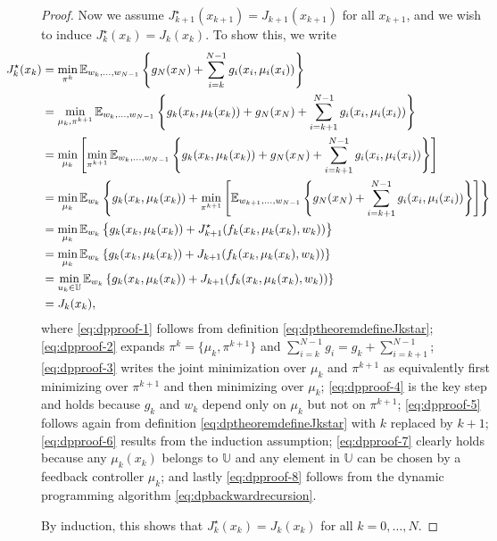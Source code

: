 \documentclass[
]{book}
\theoremstyle{definition}
\theoremstyle{definition}
\theoremstyle{definition}
\theoremstyle{definition}
\theoremstyle{remark}
\begin{document}
\begin{proof}
Now we assume \(J^\star_{k+1}(x_{k+1}) = J_{k+1}(x_{k+1})\) for all \(x_{k+1}\), and we wish to induce \(J^\star_{k}(x_{k}) = J_{k}(x_{k})\). To show this, we write
\begin{align}
\hspace{-16mm} J^\star_{k}(x_k) &= \min_{\pi^k} \mathbb{E}_{w_k,\dots,w_{N-1}} \left\{ g_N(x_N) + \sum_{i=k}^{N-1} g_i (x_i,\mu_i(x_i)) \right\} \label{eq:dpproof-1}\\
&= \min_{\mu_k,\pi^{k+1}} \mathbb{E}_{w_k,\dots,w_{N-1}} \left\{ g_k(x_k,\mu_k(x_k)) + g_N(x_N) + \sum_{i=k+1}^{N-1} g_i(x_i,\mu_i(x_i))  \right\}
\label{eq:dpproof-2}\\
&= \min_{\mu_k} \left[ \min_{\pi^{k+1}} \mathbb{E}_{w_k,\dots,w_{N-1}} \left\{ g_k(x_k,\mu_k(x_k)) + g_N(x_N) + \sum_{i=k+1}^{N-1} g_i(x_i,\mu_i(x_i))  \right\}\right] \label{eq:dpproof-3}\\
&= \min_{\mu_k} \mathbb{E}_{w_k} \left\{ g_k(x_k,\mu_k(x_k)) + \min_{\pi^{k+1}} \left[ \mathbb{E}_{w_{k+1},\dots,w_{N-1}} \left\{ g_N(x_N) + \sum_{i=k+1}^{N-1} g_i(x_i,\mu_i(x_i))  \right\}  \right]    \right\} \label{eq:dpproof-4}\\
&= \min_{\mu_k} \mathbb{E}_{w_k} \left\{ g_k(x_k,\mu_k(x_k)) + J^\star_{k+1}(f_k(x_k,\mu_k(x_k),w_k)) \right\} \label{eq:dpproof-5}\\
&= \min_{\mu_k} \mathbb{E}_{w_k} \left\{ g_k(x_k,\mu_k(x_k)) + J_{k+1}(f_k(x_k,\mu_k(x_k),w_k)) \right\} \label{eq:dpproof-6}\\
&= \min_{u_k \in \mathbb{U}} \mathbb{E}_{w_k} \left\{ g_k(x_k,\mu_k(x_k)) + J_{k+1}(f_k(x_k,\mu_k(x_k),w_k)) \right\} \label{eq:dpproof-7}\\
&= J_k(x_k), \label{eq:dpproof-8}
\end{align}
where \eqref{eq:dpproof-1} follows from definition \eqref{eq:dptheoremdefineJkstar}; \eqref{eq:dpproof-2} expands \(\pi^k = \{ \mu_k, \pi^{k+1}\}\) and \(\sum_{i=k}^{N-1} g_i = g_k + \sum_{i=k+1}^{N-1}\); \eqref{eq:dpproof-3} writes the joint minimization over \(\mu_k\) and \(\pi^{k+1}\) as equivalently first minimizing over \(\pi^{k+1}\) and then minimizing over \(\mu_k\); \eqref{eq:dpproof-4} is the key step and holds because \(g_k\) and \(w_k\) depend only on \(\mu_k\) but not on \(\pi^{k+1}\); \eqref{eq:dpproof-5} follows again from definition \eqref{eq:dptheoremdefineJkstar} with \(k\) replaced by \(k+1\); \eqref{eq:dpproof-6} results from the induction assumption; \eqref{eq:dpproof-7} clearly holds because any \(\mu_k(x_k)\) belongs to \(\mathbb{U}\) and any element in \(\mathbb{U}\) can be chosen by a feedback controller \(\mu_k\); and lastly \eqref{eq:dpproof-8} follows from the dynamic programming algorithm \eqref{eq:dpbackwardrecursion}.

By induction, this shows that \(J^\star_k(x_k) = J_k(x_k)\) for all \(k=0,\dots,N\).
\end{proof}
\end{document}
